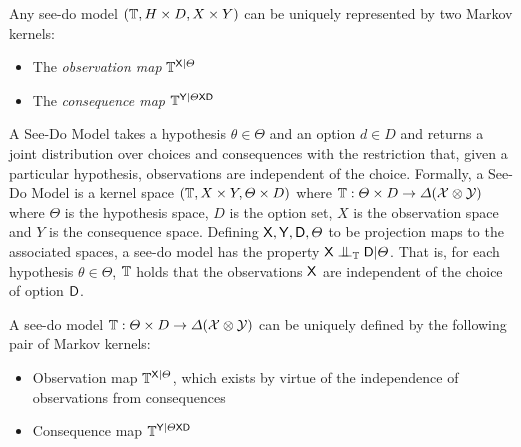 \begin{theorem}\label{th:obs_cmaps}
Any see-do model $(\mathbb{T},H\times D,X\times Y)$ can be uniquely represented by two Markov kernels:
\begin{itemize}
    \item The \emph{observation map} $\mathbb{T}^{\mathsf{X}|\Theta}$
    \item The \emph{consequence map} $\mathbb{T}^{\mathsf{Y}|\Theta\mathsf{X}\mathsf{D}}$
\end{itemize}
\end{theorem}

\begin{definition}
A See-Do Model takes a hypothesis $\theta\in \Theta$ and an option $d\in D$ and returns a joint distribution over choices and consequences with the restriction that, given a particular hypothesis, observations are independent of the choice. Formally, a See-Do Model is a kernel space $(\mathbb{T},X\times Y, \Theta\times D)$ where $\mathbb{T}:\Theta\times D\to \Delta(\mathcal{X}\otimes\mathcal{Y})$ where $\Theta$ is the hypothesis space, $D$ is the option set, $X$ is the observation space and $Y$ is the consequence space. Defining $\mathsf{X},\mathsf{Y},\mathsf{D},\Theta$ to be projection maps to the associated spaces, a see-do model has the property $\RV{X}\CI_{\kernel{T}} \RV{D}|\Theta$. That is, for each hypothesis $\theta\in \Theta$, $\mathbb{T}$ holds that the observations $\mathsf{X}$ are independent of the choice of option $\mathsf{D}$.

A see-do model $\mathbb{T}:\Theta\times D\to \Delta(\mathcal{X}\otimes\mathcal{Y})$ can be uniquely defined by the following pair of Markov kernels:
\begin{itemize}
    \item Observation map $\mathbb{T}^{\mathsf{X}|\Theta}$, which exists by virtue of the independence of observations from consequences
    \item Consequence map $\mathbb{T}^{\mathsf{Y}|\Theta\mathsf{X}\mathsf{D}}$
\end{itemize}
\end{definition}

